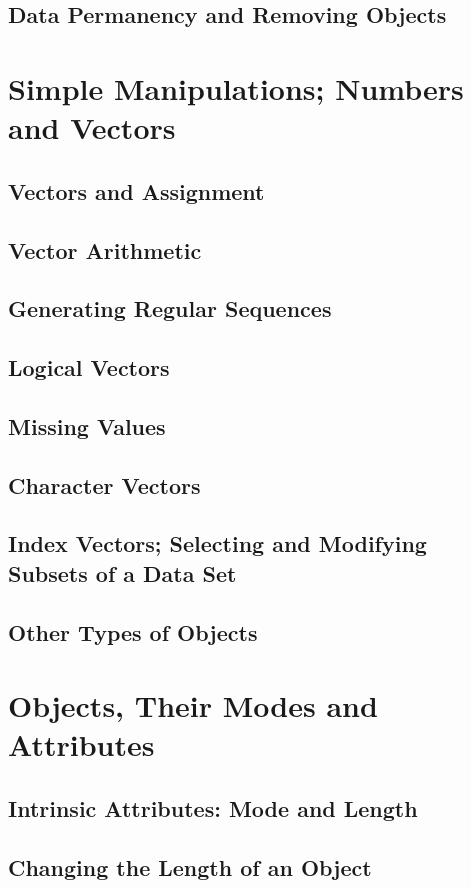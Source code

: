 \documentclass{article}
\begin{document}
\subsection{Data Permanency and Removing Objects}

\section{Simple Manipulations; Numbers and Vectors}
\subsection{Vectors and Assignment}
\subsection{Vector Arithmetic}
\subsection{Generating Regular Sequences}
\subsection{Logical Vectors}
\subsection{Missing Values}
\subsection{Character Vectors}
\subsection{Index Vectors; Selecting and Modifying Subsets of a Data Set}
\subsection{Other Types of Objects}

\section{Objects, Their Modes and Attributes}
\subsection{Intrinsic Attributes: Mode and Length}
\subsection{Changing the Length of an Object}
\end{document}
